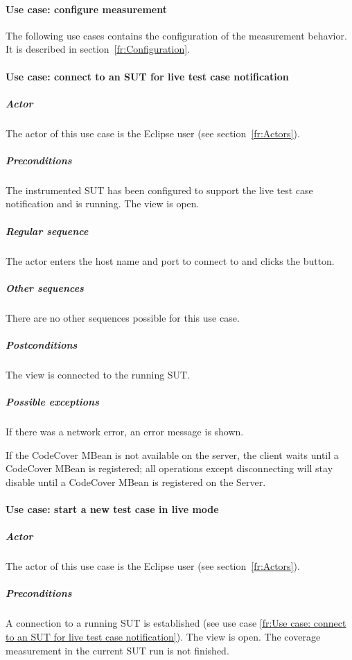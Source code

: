\paragraph{Use case: configure measurement}
The following use cases contains the configuration of the measurement behavior. It is described in section~\ref{fr:Configuration}.

\paragraph{Use case: connect to an SUT for live test case notification} \label{fr:Use case: connect to an SUT for live test case notification}

\subparagraph{Actor} The actor of this use case is the Eclipse user
(see section~\ref{fr:Actors}).

\subparagraph{Preconditions} The instrumented SUT has been configured
to support the live test case notification and is running. The
 view is open.

\subparagraph{Regular sequence} The actor enters the host name and
port to connect to and clicks the  button.

\subparagraph{Other sequences}
There are no other sequences possible for this use case.

\subparagraph{Postconditions}
The view is connected to the running SUT.

\subparagraph{Possible exceptions} If there was a network error, an
error message is shown. 

If the CodeCover MBean is not available on the server, the client
waits until a CodeCover MBean is registered; all operations except
disconnecting will stay disable until a CodeCover MBean is registered
on the Server.

\paragraph{Use case: start a new test case in live mode} \label{fr:Use case: start a new test case in live mode}

\subparagraph{Actor} The actor of this use case is the Eclipse user
(see section~\ref{fr:Actors}).

\subparagraph{Preconditions} A connection to a running SUT is
established (see use case \ref{fr:Use case: connect to an SUT for live
  test case notification}). The  view is
open. The coverage measurement in the current SUT run is not finished.

